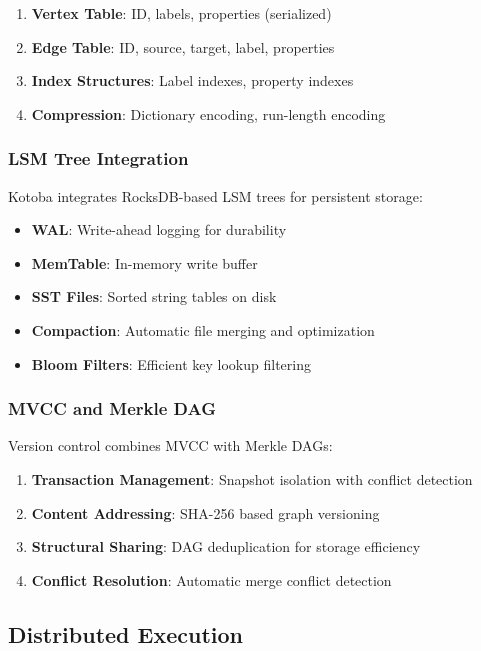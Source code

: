\documentclass[11pt,a4paper]{article}
\begin{document}
\begin{enumerate}
\item \textbf{Vertex Table}: ID, labels, properties (serialized)
\item \textbf{Edge Table}: ID, source, target, label, properties
\item \textbf{Index Structures}: Label indexes, property indexes
\item \textbf{Compression}: Dictionary encoding, run-length encoding
\end{enumerate}

\subsubsection{LSM Tree Integration}
\label{subsubsec:lsm_integration}

Kotoba integrates RocksDB-based LSM trees for persistent storage:

\begin{itemize}
\item \textbf{WAL}: Write-ahead logging for durability
\item \textbf{MemTable}: In-memory write buffer
\item \textbf{SST Files}: Sorted string tables on disk
\item \textbf{Compaction}: Automatic file merging and optimization
\item \textbf{Bloom Filters}: Efficient key lookup filtering
\end{itemize}

\subsubsection{MVCC and Merkle DAG}
\label{subsubsec:mvcc_merkle}

Version control combines MVCC with Merkle DAGs:

\begin{enumerate}
\item \textbf{Transaction Management}: Snapshot isolation with conflict detection
\item \textbf{Content Addressing}: SHA-256 based graph versioning
\item \textbf{Structural Sharing}: DAG deduplication for storage efficiency
\item \textbf{Conflict Resolution}: Automatic merge conflict detection
\end{enumerate}

\subsection{Distributed Execution}
\label{subsec:distributed}
\end{document}
